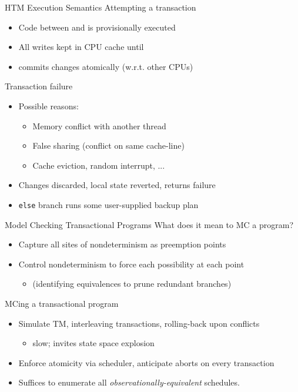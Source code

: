 \documentclass[xcolor=dvipsnames]{beamer}
\begin{document}
\begin{frame}{HTM Execution Semantics}
	Attempting a transaction
	\begin{itemize}
		\item Code between \xbegin and \xend is provisionally executed
		\item All writes kept in CPU cache until \xend
		\item \xend commits changes atomically (w.r.t. other CPUs)
	\end{itemize}
	\pause
	\linegap

	Transaction failure
	\begin{itemize}
		\item Possible reasons:
			\begin{itemize}
				\item Memory conflict with another thread
				\item False sharing (conflict on same cache-line)
				\item Cache eviction, random interrupt, ...
			\end{itemize}
		\item Changes discarded, local state reverted, \xbegin returns failure
		\item {\tt else} branch runs some user-supplied backup plan
	\end{itemize}
\end{frame}

\begin{frame}{Model Checking Transactional Programs}
	What does it mean to MC a program?
	\begin{itemize}
		\item Capture all sites of nondeterminism as preemption points
		\item Control nondeterminism to force each possibility at each point
			\begin{itemize}
				\item (identifying equivalences to prune redundant branches)
			\end{itemize}
	\end{itemize}
	\pause
	\linegap

	MCing a transactional program
	\begin{itemize}
		\item Simulate TM, interleaving transactions, rolling-back upon conflicts
			\begin{itemize}
				\item slow; invites state space explosion
			\end{itemize}
		\item Enforce atomicity via scheduler, anticipate aborts on every transaction
		\item Suffices to enumerate all {\em observationally-equivalent} schedules.
	\end{itemize}
\end{frame}
\end{document}
